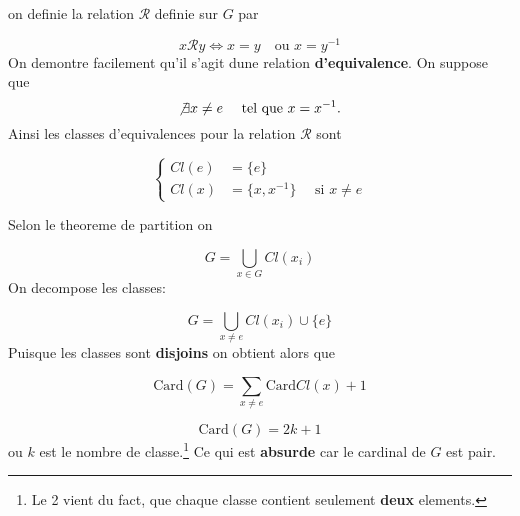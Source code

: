 \documentclass{report}
\begin{document}
\begin{myproof}
  on definie la relation $\mathcal{R}$ definie sur $G$ par

  $$
  x \mathcal{R} y \iff x = y \quad \text {ou } x = y^{-1}
  $$
  On demontre facilement qu'il s'agit dune relation \textbf{d'equivalence}.
  On suppose que 
  $$
  \not \exists x \ne e \quad \text{ tel que } x = x^{-1}.
  $$
  Ainsi les classes d'equivalences pour la relation $\mathcal{R}$ sont

  $$
  \begin{cases}
    Cl(e) &= \{e\}\\
    Cl(x) &= \{x, x^{-1}\} \quad  \text{ si } x\ne e
  \end{cases}
  $$

  Selon le theoreme de partition  on 

  $$
  G = \bigcup_{x\in G} Cl(x_i) 
  $$
  On decompose les classes:

  $$
  G = \bigcup_{x\ne e} Cl(x_i) \cup \{e\}
  $$
  Puisque les classes sont \textbf{disjoins} on obtient alors que

  $$
  \text{Card}(G) = \sum_{x\ne e} \text{Card}Cl(x) + 1
  $$

  $$
  \text{Card}(G) = 2k + 1
  $$
  ou $k$ est le nombre de classe.\footnote{
    Le 2 vient du fact, que chaque classe contient seulement \textbf{deux} elements.
  }
  Ce qui est \textbf{absurde} car le cardinal de $G$ est pair.
\end{myproof}
\end{document}
